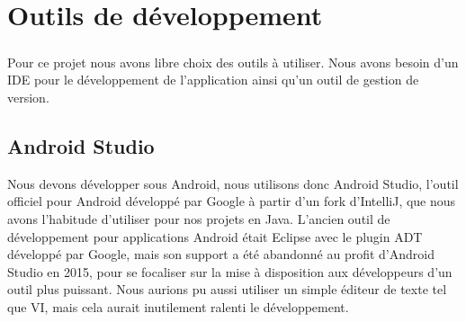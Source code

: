 \documentclass[a4paper,10pt]{report}
\begin{document}

\chapter{Outils de développement}
  \paragraph{}
  Pour ce projet nous avons libre choix des outils à utiliser. Nous avons besoin d'un IDE pour le développement de l'application ainsi qu'un outil de gestion de version.

  \section{Android Studio}
  Nous devons développer sous Android, nous utilisons donc Android Studio, l'outil officiel pour Android développé par Google à partir d'un fork d'IntelliJ, que nous avons l'habitude d'utiliser pour nos projets en Java. L'ancien outil de développement pour applications Android était Eclipse avec le plugin ADT développé par Google, mais son support a été abandonné au profit d'Android Studio en 2015, pour se focaliser sur la mise à disposition aux développeurs d'un outil plus puissant. Nous aurions pu aussi utiliser un simple éditeur de texte tel que VI, mais cela aurait inutilement ralenti le développement.
\end{document}

